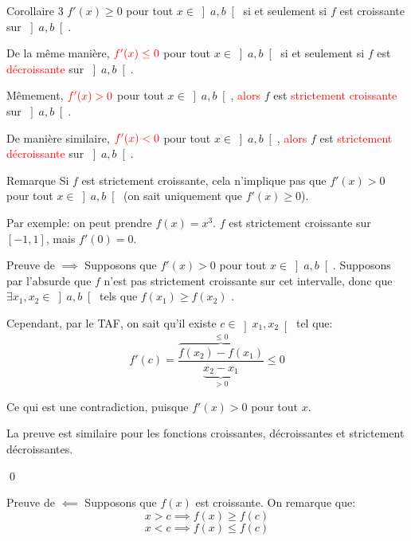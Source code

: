 \documentclass[a4paper]{article}
\begin{document}
\begin{parag}{Corollaire 3}
    $f'\left(x\right) \geq 0$ pour tout $x \in \left]a, b\right[ $ si et seulement si $f$ est croissante sur $\left]a, b\right[ $.
    
    De la même manière, ${\color{red}f'\left(x\right) \leq 0}$ pour tout $x \in \left]a, b\right[ $ si et seulement si $f$ est \textcolor{red}{décroissante} sur $\left]a, b\right[ $.

    Mêmement, ${\color{red}f'\left(x\right) > 0}$ pour tout $x \in \left]a, b\right[ $, \textcolor{red}{alors} $f$ est \textcolor{red}{strictement croissante} sur $\left]a, b\right[ $.

    De manière similaire, ${\color{red}f'\left(x\right) < 0}$ pour tout $x \in \left]a, b\right[ $, \textcolor{red}{alors} $f$ est \textcolor{red}{strictement décroissante} sur $\left]a, b\right[ $.

    \begin{subparag}{Remarque}
        Si $f$ est strictement croissante, cela n'implique pas que $f'\left(x\right) > 0$ pour tout $x \in \left]a, b\right[ $ (on sait uniquement que $f'\left(x\right) \geq 0$). 

        Par exemple: on peut prendre $f\left(x\right) = x^3$. $f$ est strictement croissante sur $\left[-1, 1\right] $, mais $f'\left(0\right) = 0$.

    \end{subparag}
    
    \begin{subparag}{Preuve de $\implies$}
        Supposons que $f'\left(x\right) > 0$ pour tout $x \in \left]a, b\right[ $. Supposons par l'absurde que $f$ n'est pas strictement croissante sur cet intervalle, donc que $\exists x_1, x_2 \in \left]a, b\right[ $ tels que $f\left(x_1\right) \geq f\left(x_2\right)$ .

        Cependant, par le TAF, on sait qu'il existe $c \in \left]x_1, x_2\right[ $ tel que: 
        \[f'\left(c\right) = \frac{\overbrace{f\left(x_2\right) - f\left(x_1\right)}^{\leq 0}}{\underbrace{x_2 - x_1}_{> 0}} \leq 0\]

        Ce qui est une contradiction, puisque $f'\left(x\right) > 0$ pour tout $x$.

        La preuve est similaire pour les fonctions croissantes, décroissantes et strictement décroissantes.

        \qed
    \end{subparag}

    \begin{subparag}{Preuve de $\impliedby$}
        Supposons que $f\left(x\right)$ est croissante. On remarque que: 
        \[x > c \implies f\left(x\right) \geq f\left(c\right)\]
        \[x < c \implies f\left(x\right) \leq f\left(c\right)\]
        

\end{subparag}
\end{parag}
\end{document}
